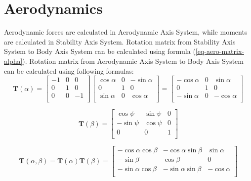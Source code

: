 \chapter{Aerodynamics}

Aerodynamic forces are calculated in Aerodynamic Axis System, while moments are calculated in Stability Axis System. Rotation matrix from Stability Axis System to Body Axis System can be calculated using formula (\ref{eq-aero-matrix-alpha}). Rotation matrix from Aerodynamic Axis System to Body Axis System can be calculated using following formulas:
\begin{equation}
  \label{eq-aero-matrix-alpha}
  \boldsymbol T \left( \alpha \right)
  =
  \left[
    \begin{matrix}
      -1 & 0 &  0 \\
       0 & 1 &  0 \\
       0 & 0 & -1 \\
    \end{matrix}
  \right]
  \left[
    \begin{matrix}
      \cos \alpha & 0 & -\sin \alpha \\
                0 & 1 &            0 \\
      \sin \alpha & 0 &  \cos \alpha \\
    \end{matrix}
  \right]
  =
  \left[
    \begin{matrix}
      -\cos \alpha & 0 &  \sin \alpha \\
                 0 & 1 &            0 \\
      -\sin \alpha & 0 & -\cos \alpha \\
    \end{matrix}
  \right]
\end{equation}

\begin{equation}
  \label{eq-aero-matrix-beta}
  \boldsymbol T \left( \beta \right)
  =
  \left[
    \begin{matrix}
       \cos\psi & \sin\psi & 0 \\
      -\sin\psi & \cos\psi & 0 \\
              0 &        0 & 1 \\
    \end{matrix}
  \right]
\end{equation}

\begin{equation}
  \boldsymbol T \left( \alpha, \beta \right)
  =
  \boldsymbol T \left( \alpha \right) \boldsymbol T \left( \beta \right)
  =
  \left[
    \begin{matrix}
      -\cos \alpha \cos \beta & -\cos \alpha \sin \beta &  \sin \alpha \\
                  -\sin \beta &              \cos \beta &            0 \\
      -\sin \alpha \cos \beta & -\sin \alpha \sin \beta & -\cos \alpha \\
    \end{matrix}
  \right]
\end{equation}

